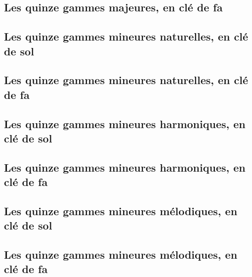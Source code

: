 \documentclass[a4paper,11pt]{article}
\begin{document}
\clearpage
\subsection{Les quinze gammes majeures, en clé de fa}
\begin{samepage}

\end{samepage}

\clearpage
\subsection{Les quinze gammes mineures naturelles, en clé de sol}
\begin{samepage}

\end{samepage}

\clearpage
\subsection{Les quinze gammes mineures naturelles, en clé de fa}
\begin{samepage}

\end{samepage}

\clearpage
\subsection{Les quinze gammes mineures harmoniques, en clé de sol}
\begin{samepage}

\end{samepage}

\clearpage
\subsection{Les quinze gammes mineures harmoniques, en clé de fa}
\begin{samepage}

\end{samepage}

\clearpage
\subsection{Les quinze gammes mineures mélodiques, en clé de sol}
\begin{samepage}

\end{samepage}

\clearpage
\subsection{Les quinze gammes mineures mélodiques, en clé de fa}
\begin{samepage}

\end{samepage}
\end{document}
